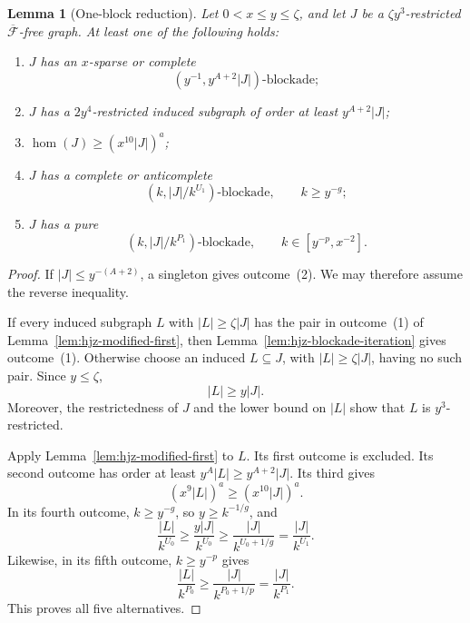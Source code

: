 \documentclass[11pt]{article}
\numberwithin{equation}{section}
\theoremstyle{plain}
\newtheorem{lemma}[theorem]{Lemma}
\theoremstyle{definition}
\begin{document}
\begin{lemma}[One-block reduction]
\label{lem:hjz-modified-once}
Let $0<x\leq y\leq\zeta$, and let $J$ be a
$\zeta y^3$-restricted $\overline{\mathcal F}$-free graph.  At least
one of the following holds:
\begin{enumerate}
\item $J$ has an $x$-sparse or complete
\[
                 (y^{-1},y^{A+2}|J|)\text{-blockade};
\]
\item $J$ has a $2y^4$-restricted induced subgraph of order at least
      $y^{A+2}|J|$;
\item $\operatorname{hom}(J)\geq(x^{10}|J|)^a$;
\item $J$ has a complete or anticomplete
\[
            (k,|J|/k^{U_1})\text{-blockade},
            \qquad k\geq y^{-g};
\]
\item $J$ has a pure
\[
            (k,|J|/k^{P_1})\text{-blockade},
            \qquad k\in[y^{-p},x^{-2}].
\]
\end{enumerate}
\end{lemma}

\begin{proof}
If $|J|\leq y^{-(A+2)}$, a singleton gives outcome~(2).  We may
therefore assume the reverse inequality.

If every induced subgraph $L$ with $|L|\geq\zeta|J|$ has the pair in
outcome~(1) of Lemma~\ref{lem:hjz-modified-first}, then
Lemma~\ref{lem:hjz-blockade-iteration} gives outcome~(1).  Otherwise
choose an induced $L\subseteq J$, with $|L|\geq\zeta|J|$, having no
such pair.  Since $y\leq\zeta$,
\begin{equation}
                             |L|\geq y|J|.
\label{eq:hjz-once-loss}
\end{equation}
Moreover, the restrictedness of $J$ and the lower bound on $|L|$
show that $L$ is $y^3$-restricted.

Apply Lemma~\ref{lem:hjz-modified-first} to $L$.  Its first outcome is
excluded.  Its second outcome has order at least
$y^A|L|\geq y^{A+2}|J|$.  Its third gives
\[
                  (x^9|L|)^a\geq(x^{10}|J|)^a.
\]
In its fourth outcome, $k\geq y^{-g}$, so
$y\geq k^{-1/g}$, and
\[
 \frac{|L|}{k^{U_0}}
      \geq \frac{y|J|}{k^{U_0}}
      \geq \frac{|J|}{k^{U_0+1/g}}
      =\frac{|J|}{k^{U_1}}.
\]
Likewise, in its fifth outcome, $k\geq y^{-p}$ gives
\[
 \frac{|L|}{k^{P_0}}
      \geq \frac{|J|}{k^{P_0+1/p}}
      =\frac{|J|}{k^{P_1}}.
\]
This proves all five alternatives.
\end{proof}
\end{document}
